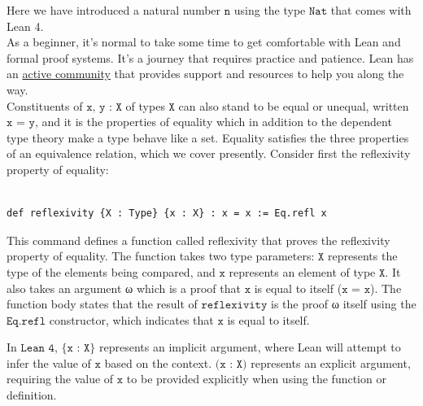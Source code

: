 \documentclass{book}
\theoremstyle{definition}
\newcounter{lcounter}
\begin{document}
Here we have introduced a natural number $\texttt{n}$ using the type $\texttt{Nat}$ that comes with Lean 4.\\

As a beginner, it's normal to take some time to get comfortable with Lean and formal proof systems. It's a journey that requires practice and patience. Lean has an \href{https://leanprover.zulipchat.com}{active community} that provides support and resources to help you along the way.\\

Constituents of $\texttt{x, y : X}$ of types $\texttt{X}$ can also stand to be equal or unequal, written $\texttt{x = y}$, and it is the properties of equality which in addition to the dependent type theory make a type behave like a set. Equality satisfies the three properties of an equivalence relation, which we cover presently. Consider first the reflexivity property of equality:\\

\begin{center}
\begin{tcolorbox}[width=5in,colback={white},title={\begin{center}\texttt{Lean \thelcounter} \addtocounter{lcounter}{1}  \end{center}},colbacktitle=Blue,coltitle=black]
\begin{verbatim}

def reflexivity {X : Type} {x : X} : x = x := Eq.refl x

\end{verbatim}
\end{tcolorbox}
\end{center}

This command defines a function called reflexivity that proves the reflexivity property of equality. The function takes two type parameters: $\texttt{X}$ represents the type of the elements being compared, and $\texttt{x}$ represents an element of type $\texttt{X}$. It also takes an argument ω which is a proof that $\texttt{x}$ is equal to itself ($\texttt{x = x}$). The function body states that the result of $\texttt{reflexivity}$ is the proof ω itself using the $\texttt{Eq.refl}$ constructor, which indicates that $\texttt{x}$  is equal to itself.

In $\texttt{Lean 4}$, $\{\texttt{x : X}\}$ represents an implicit argument, where Lean will attempt to infer the value of $\texttt{x}$ based on the context. $\texttt{(x : X)}$ represents an explicit argument, requiring the value of $\texttt{x}$ to be provided explicitly when using the function or definition.
\end{document}
